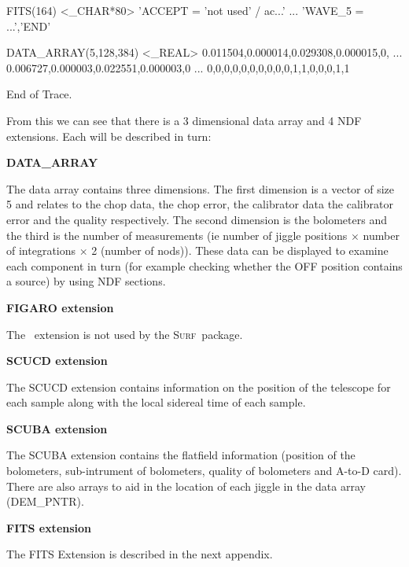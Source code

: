 \documentclass[twoside,11pt]{starlink}
\providecommand{\scusoft}          {\textsc{Surf}}
\providecommand{\Figaro}{\xref{{\textsc{Figaro}}}{sun86}{}}
\begin{document}
\begin{terminalv}
      FITS(164)      <_CHAR*80>      'ACCEPT  = 'not used'           / ac...'
                                     ... 'WAVE_5  =                 ...','END'

   DATA_ARRAY(5,128,384)  <_REAL>   0.011504,0.000014,0.029308,0.000015,0,
                                    ... 0.006727,0.000003,0.022551,0.000003,0
                                        ... 0,0,0,0,0,0,0,0,0,0,1,1,0,0,0,1,1

End of Trace.
\end{terminalv}

From this we can see that there is a 3 dimensional data array and 4 NDF
extensions. Each will be described in turn:

\begin{description}
\item \textbf{DATA\_ARRAY}

The data array contains three dimensions. The first dimension is a vector of
size 5 and relates to the chop data, the chop error, the calibrator data the
calibrator error and the quality respectively. The second dimension is the
bolometers and the third is the number of measurements (ie number of jiggle
positions $\times$ number of integrations $\times$ 2 (number of nods)). These
data can be displayed to examine each component in turn (for example checking
whether the OFF position contains a source) by using NDF sections.

\item \textbf{FIGARO extension}

The \Figaro\ extension is not used by the \scusoft\ package.

\item \textbf{SCUCD extension}

The SCUCD extension contains information on the position of the telescope for
each sample along with the local sidereal time of each sample.

\item \textbf{SCUBA extension}

The SCUBA extension contains the flatfield information (position of the
bolometers, sub-intrument of bolometers, quality of bolometers and A-to-D
card). There are also arrays to aid in the location of each jiggle in the data
array (DEM\_PNTR).

\item \textbf{FITS extension}

The FITS Extension is described in the next appendix.

\end{description}
\end{document}
